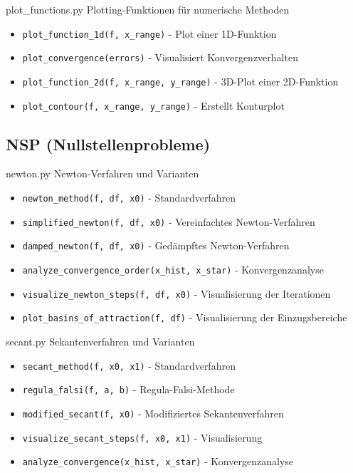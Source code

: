 \begin{KR}{plot\_functions.py}
    Plotting-Funktionen für numerische Methoden
    \begin{itemize}
        \item \texttt{plot\_function\_1d(f, x\_range)} - Plot einer 1D-Funktion
        \item \texttt{plot\_convergence(errors)} - Visualisiert Konvergenzverhalten
        \item \texttt{plot\_function\_2d(f, x\_range, y\_range)} - 3D-Plot einer 2D-Funktion
        \item \texttt{plot\_contour(f, x\_range, y\_range)} - Erstellt Konturplot
    \end{itemize}
\end{KR}

\subsection{NSP (Nullstellenprobleme)}

\begin{KR}{newton.py}
    Newton-Verfahren und Varianten
    \begin{itemize}
        \item \texttt{newton\_method(f, df, x0)} - Standardverfahren
        \item \texttt{simplified\_newton(f, df, x0)} - Vereinfachtes Newton-Verfahren
        \item \texttt{damped\_newton(f, df, x0)} - Gedämpftes Newton-Verfahren
        \item \texttt{analyze\_convergence\_order(x\_hist, x\_star)} - Konvergenzanalyse
        \item \texttt{visualize\_newton\_steps(f, df, x0)} - Visualisierung der Iterationen
        \item \texttt{plot\_basins\_of\_attraction(f, df)} - Visualisierung der Einzugsbereiche
    \end{itemize}
\end{KR}

\begin{KR}{secant.py}
    Sekantenverfahren und Varianten
    \begin{itemize}
        \item \texttt{secant\_method(f, x0, x1)} - Standardverfahren
        \item \texttt{regula\_falsi(f, a, b)} - Regula-Falsi-Methode
        \item \texttt{modified\_secant(f, x0)} - Modifiziertes Sekantenverfahren
        \item \texttt{visualize\_secant\_steps(f, x0, x1)} - Visualisierung
        \item \texttt{analyze\_convergence(x\_hist, x\_star)} - Konvergenzanalyse
    \end{itemize}
\end{KR}

